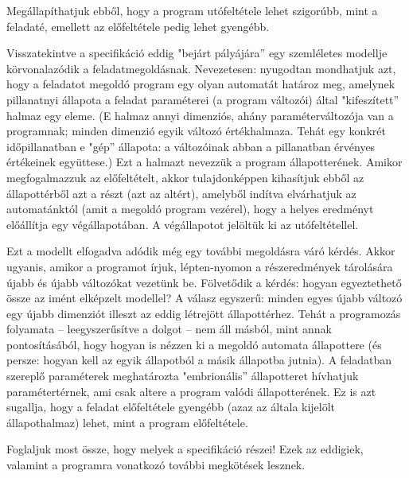 \documentclass[margin=0px]{article}
\begin{document}
Megállapíthatjuk ebből, hogy a program utófeltétele lehet szigorúbb, mint a feladaté, emellett az előfeltétele pedig lehet gyengébb.

Visszatekintve a specifikáció eddig "bejárt pályájára” egy szemléletes modellje körvonalazódik a feladatmegoldásnak. Nevezetesen: nyugodtan mondhatjuk azt, hogy a feladatot megoldó program egy olyan automatát határoz meg, amelynek pillanatnyi állapota a feladat paraméterei (a program változói) által "kifeszített” halmaz egy eleme. (E halmaz annyi dimenziós, ahány paraméterváltozója van a programnak; minden dimenzió egyik változó értékhalmaza. Tehát egy konkrét időpillanatban e "gép” állapota: a változóinak abban a pillanatban érvényes értékeinek együttese.) Ezt a halmazt nevezzük a program állapotterének. Amikor megfogalmazzuk az előfeltételt, akkor tulajdonképpen kihasítjuk ebből az állapottérből azt a részt (azt az altért), amelyből indítva elvárhatjuk az automatánktól (amit a megoldó program vezérel), hogy a helyes eredményt előállítja egy végállapotában. A végállapotot jelöltük ki az utófeltétellel.

Ezt a modellt elfogadva adódik még egy további megoldásra váró kérdés. Akkor ugyanis, amikor a programot írjuk, lépten-nyomon a részeredmények tárolására újabb és újabb változókat vezetünk be. Fölvetődik a kérdés: hogyan egyeztethető össze az imént elképzelt modellel? A válasz egyszerű: minden egyes újabb változó egy újabb dimenziót illeszt az eddig létrejött állapottérhez. Tehát a programozás folyamata – leegyszerűsítve a dolgot – nem áll másból, mint annak pontosításából, hogy hogyan is nézzen ki a megoldó automata állapottere (és persze: hogyan kell az egyik állapotból a másik állapotba jutnia). A feladatban szereplő paraméterek meghatározta "embrionális” állapotteret hívhatjuk paramétertérnek, ami csak altere a program valódi állapotterének. Ez is azt sugallja, hogy a feladat előfeltétele gyengébb (azaz az általa kijelölt állapothalmaz) lehet, mint a program előfeltétele.

Foglaljuk most össze, hogy melyek a specifikáció részei! Ezek az eddigiek, valamint a programra vonatkozó további megkötések lesznek.
\end{document}

